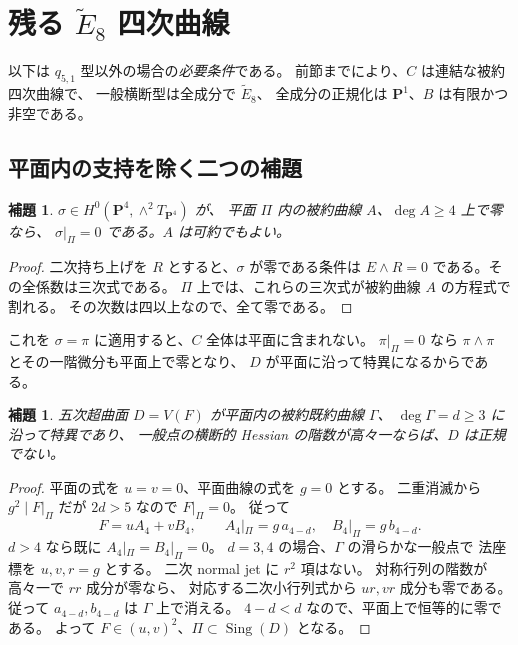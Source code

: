 \documentclass[11pt,a4paper]{ltjsarticle}
\newcommand{\PP}{\mathbf P}\renewcommand{\AA}{\mathbf A}
\newtheorem{lemma}[theorem]{補題}
\theoremstyle{remark}\newtheorem{remark}[theorem]{注意}
\begin{document}
\section{残る \texorpdfstring{$\widetilde E_8$}{E8} 四次曲線}\label{sec:e8}

以下は $q_{5,1}$ 型以外の場合の\emph{必要条件}である。
前節までにより、$C$ は連結な被約四次曲線で、
一般横断型は全成分で $\widetilde E_8$、
全成分の正規化は $\PP^1$、$B$ は有限かつ非空である。

\subsection{平面内の支持を除く二つの補題}

\begin{lemma}\label{lem:plane-zero}
$\sigma\in H^0(\PP^4,\wedge^2T_{\PP^4})$ が、
平面 $\Pi$ 内の被約曲線 $A$、$\deg A\ge4$ 上で零なら、
$\sigma|_\Pi=0$ である。$A$ は可約でもよい。
\end{lemma}
\begin{proof}
二次持ち上げを $R$ とすると、$\sigma$ が零である条件は
$E\wedge R=0$ である。その全係数は三次式である。
$\Pi$ 上では、これらの三次式が被約曲線 $A$ の方程式で割れる。
その次数は四以上なので、全て零である。
\end{proof}

これを $\sigma=\pi$ に適用すると、$C$ 全体は平面に含まれない。
$\pi|_\Pi=0$ なら $\pi\wedge\pi$ とその一階微分も平面上で零となり、
$D$ が平面に沿って特異になるからである。

\begin{lemma}\label{lem:plane-hessian}
五次超曲面 $D=V(F)$ が平面内の被約既約曲線 $\Gamma$、
$\deg\Gamma=d\ge3$ に沿って特異であり、
一般点の横断的 Hessian の階数が高々一ならば、$D$ は正規でない。
\end{lemma}
\begin{proof}
平面の式を $u=v=0$、平面曲線の式を $g=0$ とする。
二重消滅から $g^2\mid F|_\Pi$ だが $2d>5$ なので $F|_\Pi=0$。
従って
\[
F=uA_4+vB_4,\qquad
A_4|_\Pi=g\,a_{4-d},\quad B_4|_\Pi=g\,b_{4-d}.
\]
$d>4$ なら既に $A_4|_\Pi=B_4|_\Pi=0$。
$d=3,4$ の場合、$\Gamma$ の滑らかな一般点で
法座標を $u,v,r=g$ とする。
二次 normal jet に $r^2$ 項はない。
対称行列の階数が高々一で $rr$ 成分が零なら、
対応する二次小行列式から $ur,vr$ 成分も零である。
従って $a_{4-d},b_{4-d}$ は $\Gamma$ 上で消える。
$4-d<d$ なので、平面上で恒等的に零である。
よって $F\in(u,v)^2$、$\Pi\subset\operatorname{Sing}(D)$ となる。
\end{proof}
\end{document}
